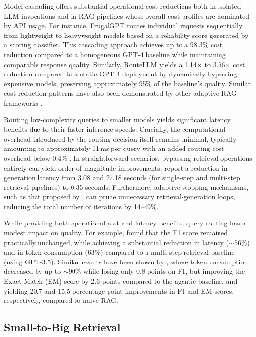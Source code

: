 Model cascading offers substantial operational cost reductions both in isolated LLM invocations and in RAG pipelines whose overall cost profiles are dominated by API usage. For instance, FrugalGPT \citep{chen2024frugalgpt} routes individual requests sequentially from lightweight to heavyweight models based on a reliability score generated by a scoring classifier. This cascading approach achieves up to a 98.3\% cost reduction compared to a homogeneous GPT-4 baseline while maintaining comparable response quality. Similarly, RouteLLM \citep{ong2025routellm} yields a 1.14$\times$ to 3.66$\times$ cost reduction compared to a static GPT-4 deployment by dynamically bypassing expensive models, preserving approximately 95\% of the baseline's quality. Similar cost reduction patterns have also been demonstrated by other adaptive RAG frameworks \citep{jeong2024adaptive, guo2026deepsieve}.

Routing low-complexity queries to smaller models yields significant latency benefits due to their faster inference speeds. Crucially, the computational overhead introduced by the routing decision itself remains minimal, typically amounting to approximately 11\,ms per query \citep{zhang2025ragrouter} with an added routing cost overhead below 0.4\% \citep{ong2025routellm}. In straightforward scenarios, bypassing retrieval operations entirely can yield order-of-magnitude improvements: \citet{jeong2024adaptive} report a reduction in generation latency from 3.08 and 27.18 seconds (for single-step and multi-step retrieval pipelines) to 0.35 seconds. Furthermore, adaptive stopping mechanisms, such as that proposed by \citet{park2025stoprag}, can prune unnecessary retrieval-generation loops, reducing the total number of iterations by 14--49\%. 

While providing both operational cost and latency benefits, query routing has a modest impact on quality. For example, \citet{jeong2024adaptive} found that the F1 score remained practically unchanged, while achieving a substantial reduction in latency ($\sim$56\%) and in token consumption (63\%) compared to a multi-step retrieval baseline (using GPT-3.5). Similar results have been shown by \citet{guo2026deepsieve}, where token consumption decreased by up to $\sim$90\% while losing only 0.8 points on F1, but improving the Exact Match (EM) score by 2.6 points compared to the agentic baseline, and yielding 20.7 and 15.5 percentage point improvements in F1 and EM scores, respectively, compared to naive RAG.

\subsection{Small-to-Big Retrieval}
\label{lit:retrieval}


